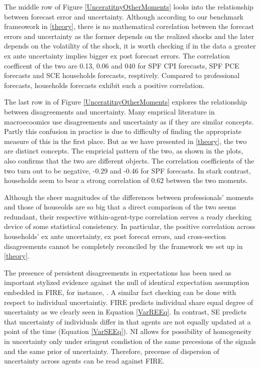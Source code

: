\documentclass[]{article}
\begin{document}
The middle row of Figure \ref{UnceratitnyOtherMoments} looks into the relationship between forecast error and uncertainty. Although according to our benchmark frameowork in \ref{theory}, there is no mathematical correlation between the forecast errors and uncertainty as the former depends on the realized shocks and the later depends on the volatility of the shock, it is worth checking if in the data a greater ex ante uncertainty implies bigger ex post forecast errors. The correlation coefficent of the two are 0.13, 0.06 and 040 for SPF CPI forecasts, SPF PCE forecasts and SCE households forecasts, resptively. Compared to professional forecasts, households forecasts exhibit such a positive correlation.  
 
 The last row in of Figure \ref{UnceratitnyOtherMoments} explores the relationship between disagreements and uncertainty. Many empriical literature in macroecoomics use disagreements and uncertainty as if they are similar concepts. Partly this confusion in practice is due to difficulty of finding the appropriate measure of this in the first place. But as we have presented in \ref{theory}, the two are distinct concepts. The empricial pattern of the two,  as shown in the plots, also confirms that the two are different objects. The correlation coefficients of the two turn out to be negative, -0.29 and -0.46 for SPF forecasts. In stark contrast, households seem to bear a strong correlation of 0.62 between the two moments.  
 
Although the sheer magnitudes of the differences between professionals' moments and those of houseolds are so big that a direct comparison of the two seems redundant, their respective within-agent-type correlation serves a ready checking device of some statistical consistency. In particular, the positive correlation across households' ex ante uncertainty, ex post forecat errors, and cross-section disagreements cannot be completely reconciled by the framework we set up in \ref{theory}. 
 

The presence of persistent disagreements in expectations has been used as  important stylized evidence against the null of identical expectation assumption embedded in FIRE, for instance, \citet{mankiw2003disagreement}. A similar fact checking can be done with respect to individual uncertaintiy. FIRE predicts individual share equal degree of uncertainty as we clearly seen in Equation \ref{VarREEq}. In contrast, SE predicts that uncertainty of individuals differ in that agents are not equally updated at a point of the time (Equation \ref{VarSEEq}). NI allows for possibility of homogeneity in uncertainty only under sringent condistion of the same precesions of the signals and the same prior of uncertainty. Therefore, precense of dispersion of uncertainty across agents can be read against FIRE.  
 
\end{document}
